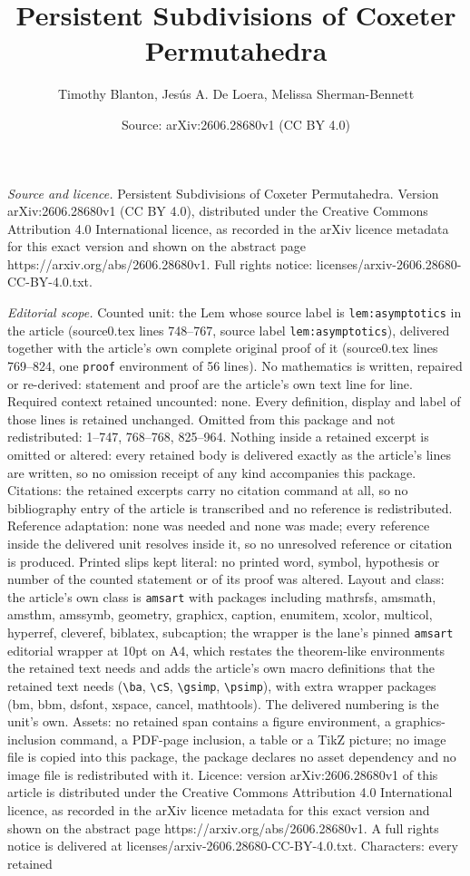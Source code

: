 \documentclass[10pt,a4paper]{amsart}
\title[Persistent Subdivisions of Coxeter Permutahedra]{Persistent Subdivisions of Coxeter Permutahedra}
\author{Timothy Blanton, Jes\'us A. De Loera, Melissa Sherman-Bennett}
\date{Source: arXiv:2606.28680v1 (CC BY 4.0)}
\begin{document}
\maketitle

\noindent\emph{Source and licence.} Persistent Subdivisions of Coxeter Permutahedra. Version arXiv:2606.28680v1 (CC BY 4.0), distributed under the Creative Commons Attribution 4.0 International licence, as recorded in the arXiv licence metadata for this exact version and shown on the abstract page https://arxiv.org/abs/2606.28680v1. Full rights notice: licenses/arxiv-2606.28680-CC-BY-4.0.txt.\par\smallskip

\noindent\textit{Editorial scope.} Counted unit: the Lem whose source label is \texttt{lem:asymptotics} in the article (source0.tex lines 748--767, source label \texttt{lem:asymptotics}), delivered together with the article's own complete original proof of it (source0.tex lines 769--824, one \texttt{proof} environment of 56 lines). No mathematics is written, repaired or re-derived: statement and proof are the article's own text line for line. Required context retained uncounted: none. Every definition, display and label of those lines is retained unchanged. Omitted from this package and not redistributed: 1--747, 768--768, 825--964. Nothing inside a retained excerpt is omitted or altered: every retained body is delivered exactly as the article's lines are written, so no omission receipt of any kind accompanies this package. Citations: the retained excerpts carry no citation command at all, so no bibliography entry of the article is transcribed and no reference is redistributed. Reference adaptation: none was needed and none was made; every reference inside the delivered unit resolves inside it, so no unresolved reference or citation is produced. Printed slips kept literal: no printed word, symbol, hypothesis or number of the counted statement or of its proof was altered. Layout and class: the article's own class is \texttt{amsart} with packages including mathrsfs, amsmath, amsthm, amssymb, geometry, graphicx, caption, enumitem, xcolor, multicol, hyperref, cleveref, biblatex, subcaption; the wrapper is the lane's pinned \texttt{amsart} editorial wrapper at 10pt on A4, which restates the theorem-like environments the retained text needs and adds the article's own macro definitions that the retained text needs (\texttt{\textbackslash ba}, \texttt{\textbackslash cS}, \texttt{\textbackslash gsimp}, \texttt{\textbackslash psimp}), with extra wrapper packages (bm, bbm, dsfont, xspace, cancel, mathtools). The delivered numbering is the unit's own. Assets: no retained span contains a figure environment, a graphics-inclusion command, a PDF-page inclusion, a table or a TikZ picture; no image file is copied into this package, the package declares no asset dependency and no image file is redistributed with it. Licence: version arXiv:2606.28680v1 of this article is distributed under the Creative Commons Attribution 4.0 International licence, as recorded in the arXiv licence metadata for this exact version and shown on the abstract page https://arxiv.org/abs/2606.28680v1. A full rights notice is delivered at licenses/arxiv-2606.28680-CC-BY-4.0.txt. Characters: every retained 
\end{document}
